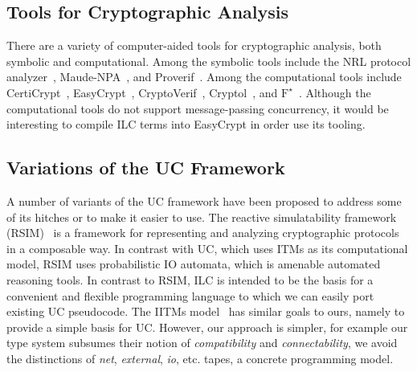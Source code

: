 \subsection{Tools for Cryptographic Analysis}
\label{subsec:tools}
There are a variety of computer-aided tools for cryptographic analysis, both
symbolic and computational. Among the symbolic tools include the NRL protocol
analyzer~\cite{meadows1996nrl}, Maude-NPA~\cite{escobar2009maude}, and
Proverif~\cite{blanchet2010proverif}. Among the computational tools include
CertiCrypt~\cite{barthe2009formal}, EasyCrypt~\cite{barthe2011computer},
CryptoVerif~\cite{blanchet2007cryptoverif}, Cryptol~\cite{lewis2003cryptol}, and
$\text{F}^{\star}$~\cite{swamy2016dependent}.
Although the computational tools do not support message-passing concurrency,
it would be interesting to compile ILC terms into EasyCrypt in order use
its tooling.


\subsection{Variations of the UC Framework}
\label{subsec:uc-variants}
A number of variants of the UC framework have been proposed to address some of
its hitches or to make it easier to use.
The reactive simulatability framework (RSIM)~\cite{backes2007reactive} is
a framework for representing and analyzing cryptographic protocols in a
composable way. In contrast with UC, which uses ITMs as its computational model,
RSIM uses probabilistic IO automata, which is amenable automated reasoning tools.
In contrast to RSIM, ILC is intended to be the basis for a convenient and
flexible programming language to which we can easily port existing UC
pseudocode. 
The IITMs model~\cite{iitm,kusters2009computational} has similar
goals to ours, namely to provide a simple basis for UC.
However, our approach is simpler, for example our type system subsumes
their notion of \emph{compatibility} and \emph{connectability}, we avoid
the distinctions of \emph{net}, \emph{external}, \emph{io}, etc. tapes,
a concrete programming model.

